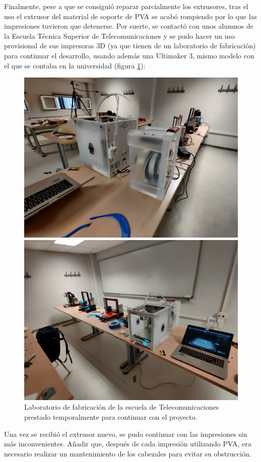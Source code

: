 Finalmente, pese a que se consiguió reparar parcialmente los extrusores, tras el
uso el extrusor del material de soporte de \ac{PVA} se acabó rompiendo por lo que
las impresiones tuvieron que detenerse. Por suerte, se contactó con unos alumnos
de la Escuela Técnica Superior de Telecomunicaciones y se pudo hacer un uso provisional
de sus impresoras 3D (ya que tienen de un laboratorio de fabricación) para continuar el
desarrollo, usando además una Ultimaker 3, mismo modelo con el que se contaba en la
universidad (figura \ref{fig:telec}):

\begin{figure}[H]
    \centering
    \begin{minipage}{.49\linewidth}
        \includegraphics[width=\linewidth]{pictures/teleco-1.jpg}
    \end{minipage}
    \hfill
    \begin{minipage}{.49\linewidth}
        \includegraphics[width=\linewidth]{pictures/teleco_2.jpg}
    \end{minipage}
    \caption{Laboratorio de fabricación de la escuela de Telecomunicaciones prestado temporalmente para continuar con el proyecto.}
    \label{fig:telec}
\end{figure}

Una vez se recibió el extrusor nuevo, se pudo continuar con las impresiones sin
más inconvenientes. Añadir que, después de cada impresión utilizando \ac{PVA}, era
necesario realizar un mantenimiento de los cabezales para evitar su obstrucción.